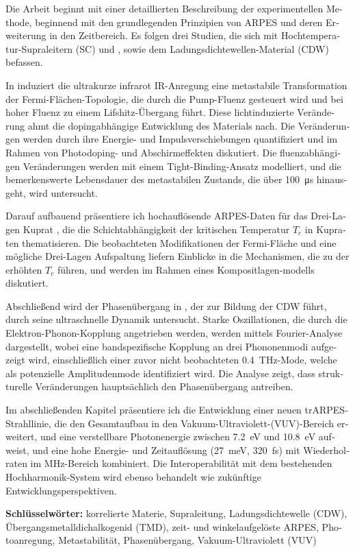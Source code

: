 \begin{otherlanguage}{german}
Die Arbeit beginnt mit einer detaillierten Beschreibung der experimentellen Methode, beginnend mit den grundlegenden Prinzipien von ARPES und deren Erweiterung in den Zeitbereich.
Es folgen drei Studien, die sich mit Hochtemperatur-Supraleitern (SC)  und , sowie dem Ladungsdichtewellen-Material (CDW)  befassen.

In  induziert die ultrakurze infrarot IR-Anregung eine metastabile Transformation der Fermi-Flächen-Topologie, die durch die Pump-Fluenz gesteuert wird und bei hoher Fluenz zu einem Lifshitz-Übergang führt.
Diese lichtinduzierte Veränderung ahmt die dopingabhängige Entwicklung des Materials nach.
Die Veränderungen werden durch ihre Energie- und Impulsverschiebungen quantifiziert und im Rahmen von Photodoping- und Abschirmeffekten diskutiert.
Die fluenzabhängigen Veränderungen werden mit einem Tight-Binding-Ansatz modelliert, und die bemerkenswerte Lebensdauer des metastabilen Zustands, die über \qty{100}{\micro\second} hinausgeht, wird untersucht.

Darauf aufbauend präsentiere ich hochauflösende ARPES-Daten für das Drei-Lagen Kuprat , die die Schichtabhängigkeit der kritischen Temperatur $T_c$ in Kupraten thematisieren.
Die beobachteten Modifikationen der Fermi-Fläche und eine mögliche Drei-Lagen Aufspaltung liefern Einblicke in die Mechanismen, die zu der erhöhten $T_c$ führen, und werden im Rahmen eines Kompositlagen-modells diskutiert.

Abschließend wird der Phasenübergang in , der zur Bildung der CDW führt, durch seine ultraschnelle Dynamik untersucht.
Starke Oszillationen, die durch die Elektron-Phonon-Kopplung angetrieben werden, werden mittels Fourier-Analyse dargestellt, wobei eine bandspezifische Kopplung an drei Phononenmodi aufgezeigt wird, einschließlich einer zuvor nicht beobachteten \qty{0.4}{\tera\hertz}-Mode, welche als potenzielle Amplitudenmode identifiziert wird.
Die Analyse zeigt, dass strukturelle Veränderungen hauptsächlich den Phasenübergang antreiben.

Im abschließenden Kapitel präsentiere ich die Entwicklung einer neuen trARPES-Strahllinie, die den Gesamtaufbau in den Vakuum-Ultraviolett-(VUV)-Bereich erweitert, und eine verstellbare Photonenergie zwischen \qty{7.2}{\electronvolt} und \qty{10.8}{\electronvolt} aufweist, und eine hohe Energie- und Zeitauflösung (\qty{27}{\milli\electronvolt}, \qty{320}{\femto\second}) mit Wiederholraten im \unit{\mega\hertz}-Bereich kombiniert.
Die Interoperabilität mit dem bestehenden Hochharmonik-System wird ebenso behandelt wie zukünftige Entwicklungsperspektiven.\hfill\break

\textbf{Schlüsselwörter:} korrelierte Materie, Supraleitung, Ladungsdichtewelle (CDW), Übergangsmetalldichalkogenid (TMD), zeit- und winkelaufgelöste ARPES, Photoanregung, Metastabilität, Phasenübergang, Vakuum-Ultraviolett (VUV)

\end{otherlanguage}




